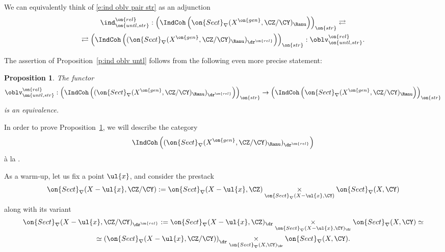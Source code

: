 \documentclass[9pt]{amsart}
\newtheorem{prop}[subsubsection]{Proposition}
\theoremstyle{remark}
\theoremstyle{definition}
\theoremstyle{remark}
\newcommand{\propref}[1]{Proposition~\ref{#1}}
\numberwithin{equation}{section}
\begin{document}
\medskip

We can equivalently think of \eqref{e:ind oblv pair str} as an adjunction
\begin{multline} \label{e:ind oblv pair str bis}
\ind^{\on{rel}}_{\on{untl,str}}:\left(\IndCoh\left(\on{Sect}_\nabla(X^{\on{gen}},\CZ/\CY)_\Ranu\right)\right)_{\on{str}} \rightleftarrows \\
\rightleftarrows \left(\IndCoh\left((\on{Sect}_\nabla(X^{\on{gen}},\CZ/\CY)_\Ranu)_{\dr^{\on{rel}}}\right)\right)_{\on{str}}:\oblv^{\on{rel}}_{\on{untl,str}}.
\end{multline} 

\sssec{}

The assertion of \propref{p:ind oblv untl} follows from the following even more precise statement:

\begin{prop} \label{p:conn autom}
The functor 
$$\oblv^{\on{rel}}_{\on{untl,str}}: \left(\IndCoh\left((\on{Sect}_\nabla(X^{\on{gen}},\CZ/\CY)_\Ranu)_{\dr^{\on{rel}}}\right)\right)_{\on{str}}\to
\left(\IndCoh\left(\on{Sect}_\nabla(X^{\on{gen}},\CZ/\CY)_\Ranu\right)\right)_{\on{str}}$$
is an equivalence. 
\end{prop}

%


In order to prove \propref{p:conn autom}, we will describe the category 
$$\IndCoh\left((\on{Sect}_\nabla(X^{\on{gen}},\CZ/\CY)_\Ranu)_{\dr^{\on{rel}}}\right)$$
\`a la \cite[Corollary 4.6.10]{Ro}. 

\sssec{}

As a warm-up, let us fix a point $\ul{x}$, and consider the prestack
$$\on{Sect}_\nabla(X-\ul{x},\CZ/\CY):=\on{Sect}_\nabla(X-\ul{x},\CZ)\underset{\on{Sect}_\nabla(X-\ul{x},\CY)}\times \on{Sect}_\nabla(X,\CY)$$
along with its variant
\begin{multline*} 
\on{Sect}_\nabla(X-\ul{x},\CZ/\CY)_{\dr^{\on{rel}}}:=
\on{Sect}_\nabla(X-\ul{x},\CZ)_\dr\underset{\on{Sect}_\nabla(X-\ul{x},\CY)_\dr}\times \on{Sect}_\nabla(X,\CY)\simeq \\
\simeq \left(\on{Sect}_\nabla(X-\ul{x},\CZ/\CY)\right)_\dr\underset{\on{Sect}_\nabla(X,\CY)_\dr}\times \on{Sect}_\nabla(X,\CY).
\end{multline*} 
\end{document}
